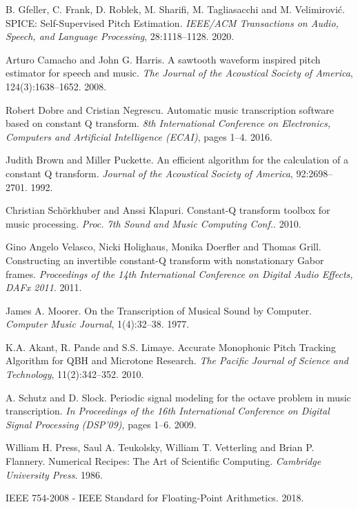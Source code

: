 \documentclass[a4paper,10pt,twocolumn]{article}
\begin{document}
\begin{thebibliography}{XX}
B. Gfeller, C. Frank, D. Roblek, M. Sharifi, M. Tagliasacchi and M. Velimirović. SPICE: Self-Supervised Pitch Estimation. \textit{IEEE/ACM Transactions on Audio, Speech, and Language Processing}, 28:1118--1128. 2020.

Arturo Camacho and John G. Harris. A sawtooth waveform inspired pitch estimator for speech and music. \textit{The Journal of the Acoustical Society of America}, 124(3):1638--1652. 2008.


Robert Dobre and Cristian Negrescu. Automatic music transcription software based on constant Q transform. \textit{8th International Conference on Electronics, Computers and Artificial Intelligence (ECAI)}, pages 1--4. 2016.

Judith Brown and Miller Puckette. An efficient algorithm for the calculation of a constant Q transform. \textit{Journal of the Acoustical Society of America}, 92:2698--2701. 1992.

Christian Schörkhuber and Anssi Klapuri. Constant-Q transform toolbox for music processing. \textit{Proc. 7th Sound and Music Computing Conf.}. 2010.

Gino Angelo Velasco, Nicki Holighaus, Monika Doerfler and Thomas Grill. Constructing an invertible constant-Q transform with nonstationary Gabor frames. \textit{Proceedings of the 14th International Conference on Digital Audio Effects, DAFx 2011}. 2011.

James A. Moorer. On the Transcription of Musical Sound by Computer. \textit{Computer Music Journal}, 1(4):32--38. 1977.

K.A. Akant, R. Pande and S.S. Limaye. Accurate Monophonic Pitch Tracking Algorithm for QBH and Microtone Research. \textit{The Pacific Journal of Science and Technology}, 11(2):342--352. 2010.

A. Schutz and D. Slock. Periodic signal modeling for the octave problem in music transcription. \textit{In Proceedings of the 16th International Conference on Digital Signal Processing (DSP’09)}, pages 1--6. 2009.

William H. Press, Saul A. Teukolsky, William T. Vetterling and Brian P. Flannery. Numerical Recipes: The Art of Scientific Computing. \textit{Cambridge University Press}. 1986.

IEEE 754-2008 - IEEE Standard for Floating-Point Arithmetics. 2018.%


\end{thebibliography}
\end{document}
